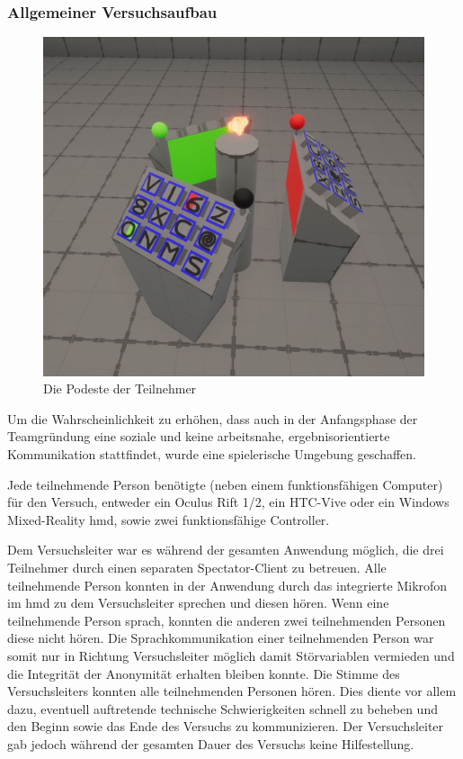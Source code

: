 \documentclass[a4paper,11pt]{article}%
\renewcommand{\\}{\vspace*{0.5\baselineskip} \newline}
\begin{document}
	\subsubsection{Allgemeiner Versuchsaufbau}

\begin{figure}[h]
		\begin{footnotesize}
			\includegraphics[width=\textwidth]{Abbildungen/Podeste.JPG}	
			\caption[Die Podeste der Teilnehmer]{Die Podeste der Teilnehmer}
			\label{Podeste}
		\end{footnotesize}
	\end{figure}

Um die Wahrscheinlichkeit zu erhöhen, dass auch in der Anfangsphase der Teamgründung eine \dq{} soziale\dq{} und keine \dq{}arbeitsnahe, ergebnisorientierte Kommunikation\dq{} stattfindet, wurde eine spielerische Umgebung geschaffen.

Jede teilnehmende Person benötigte (neben einem funktionsfähigen Computer) für den Versuch, entweder ein Oculus Rift 1/2, ein HTC-Vive oder ein Windows Mixed-Reality \ac{hmd}, sowie zwei funktionsfähige Controller.

Dem Versuchsleiter war es während der gesamten Anwendung möglich, die drei Teilnehmer durch einen separaten Spectator-Client zu betreuen. Alle teilnehmende Person konnten in der Anwendung durch das integrierte Mikrofon im \ac{hmd} zu dem Versuchsleiter sprechen und diesen hören. Wenn eine teilnehmende Person sprach, konnten die anderen zwei teilnehmenden Personen diese nicht hören. Die Sprachkommunikation einer teilnehmenden Person war somit nur in Richtung Versuchsleiter möglich damit Störvariablen vermieden und die Integrität der Anonymität erhalten bleiben konnte.
Die Stimme des Versuchsleiters konnten alle teilnehmenden Personen hören. Dies diente vor allem dazu, eventuell auftretende technische Schwierigkeiten schnell zu beheben und den Beginn sowie das Ende des Versuchs zu kommunizieren. Der Versuchsleiter gab jedoch während der gesamten Dauer des Versuchs keine Hilfestellung.
\end{document}
